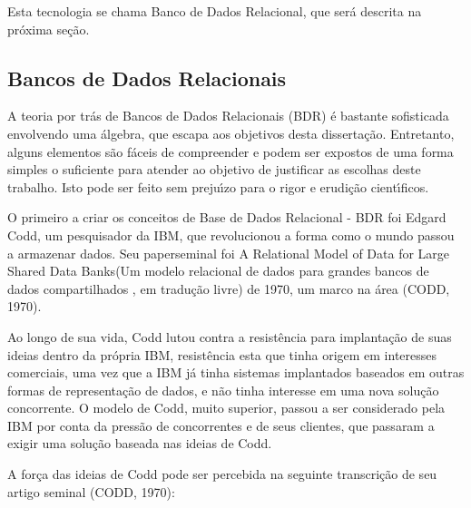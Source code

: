 \documentclass[
12pt,		%
openright,	%
twoside,  %
a4paper,			%
chapter=TITLE,		%
english,			%
french,				%
spanish,			%
brazil				%
]{USPSC-classe/USPSC}
\begin{document}
Esta tecnologia se chama \textquotedbl Banco de Dados Relacional\textquotedbl , que ser\'a descrita na pr\'oxima se\c{c}\~ao.








\subsection[Bancos de Dados Relacionais]{Bancos de Dados Relacionais}\label{Bancos de Dados Relacionais}
A teoria por tr\'as de Bancos de Dados Relacionais (BDR) \'e bastante sofisticada envolvendo uma \'algebra, que escapa aos objetivos desta disserta\c{c}\~ao. Entretanto, alguns elementos s\~ao f\'aceis de compreender e podem ser expostos  de uma forma simples o suficiente para atender ao objetivo de justificar as escolhas deste trabalho. Isto pode ser feito sem preju\'{\i}zo para o rigor e erudi\c{c}\~ao cient\'{\i}ficos.








O primeiro a criar os conceitos de Base de Dados Relacional - BDR foi Edgard Codd, um pesquisador da IBM, que revolucionou a forma como o mundo passou a armazenar dados. Seu \textquotedbl paper\textquotedbl  seminal foi  \textquotedbl A Relational Model of Data for Large Shared Data Banks\textquotedbl  (\textquotedbl  Um modelo relacional de dados para grandes bancos de dados compartilhados \textquotedbl , em tradu\c{c}\~ao livre) de 1970, um marco na \'area (CODD, 1970).








Ao longo de sua vida, Codd lutou contra a resist\^encia para implanta\c{c}\~ao de suas ideias dentro da pr\'opria IBM, resist\^encia esta que tinha origem em interesses comerciais, uma vez que a IBM j\'a tinha sistemas implantados baseados em outras formas de representa\c{c}\~ao de dados, e n\~ao tinha interesse em uma nova solu\c{c}\~ao concorrente. O modelo de Codd, muito superior, passou a ser considerado pela IBM por conta da press\~ao de concorrentes e de seus clientes, que passaram a exigir uma solu\c{c}\~ao baseada nas ideias de Codd.








A for\c{c}a das ideias de Codd pode ser percebida na seguinte transcri\c{c}\~ao de seu artigo seminal (CODD, 1970):
\end{document}
